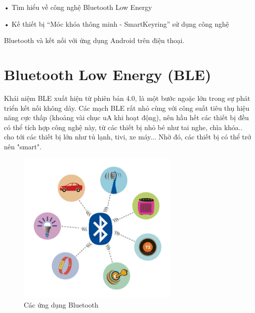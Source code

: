 • Tìm hiểu về công nghệ Bluetooth Low Energy

• Kế thiết bị “Móc khóa thông minh - SmartKeyring” sử dụng công nghệ

Bluetooth và kết nối với ứng dụng Android trên điện thoại.

\nomenclature[g-p]{$\pi$}{ $\simeq 3.14\ldots$}                                             %

\section{Bluetooth Low Energy (BLE) }  %
\label{section1.3} 
Khái niệm BLE xuất hiện từ phiên bản 4.0, là một bước ngoặc lớn trong sự phát triển kết nối không dây. Các mạch BLE rất nhỏ cùng với công suất tiêu thụ hiệu năng cực thấp (khoảng vài chục uA khi hoạt động), nên hầu hết các thiết bị đều có thể tích hợp công nghệ này, từ các thiết bị nhỏ bé như tai nghe, chìa khóa.. cho tới các thiết bị lớn như tủ lạnh, tivi, xe máy... Nhờ đó, các thiết bị có thể trở nên "smart".\cite{hte}
\begin{figure}[H]
	\centering    
	\includegraphics[width=0.7\textwidth]{btuse}
	\caption[Các ứng dụng Bluetooth]{Các ứng dụng Bluetooth}
	\label{fig:btuse}
\end{figure}
